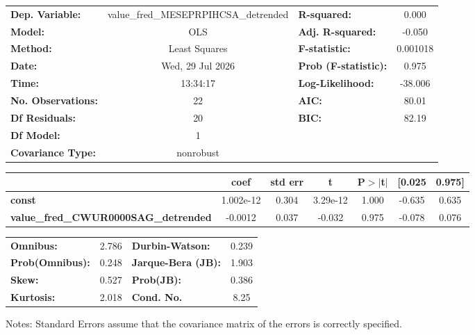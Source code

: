 \begin{center}
\begin{tabular}{lclc}
\toprule
\textbf{Dep. Variable:}                      & value\_fred\_MESEPRPIHCSA\_detrended & \textbf{  R-squared:         } &     0.000   \\
\textbf{Model:}                              &                 OLS                  & \textbf{  Adj. R-squared:    } &    -0.050   \\
\textbf{Method:}                             &            Least Squares             & \textbf{  F-statistic:       } &  0.001018   \\
\textbf{Date:}                               &           Wed, 29 Jul 2026           & \textbf{  Prob (F-statistic):} &    0.975    \\
\textbf{Time:}                               &               13:34:17               & \textbf{  Log-Likelihood:    } &   -38.006   \\
\textbf{No. Observations:}                   &                    22                & \textbf{  AIC:               } &     80.01   \\
\textbf{Df Residuals:}                       &                    20                & \textbf{  BIC:               } &     82.19   \\
\textbf{Df Model:}                           &                     1                & \textbf{                     } &             \\
\textbf{Covariance Type:}                    &              nonrobust               & \textbf{                     } &             \\
\bottomrule
\end{tabular}
\begin{tabular}{lcccccc}
                                             & \textbf{coef} & \textbf{std err} & \textbf{t} & \textbf{P$> |$t$|$} & \textbf{[0.025} & \textbf{0.975]}  \\
\midrule
\textbf{const}                               &    1.002e-12  &        0.304     &  3.29e-12  &         1.000        &       -0.635    &        0.635     \\
\textbf{value\_fred\_CWUR0000SAG\_detrended} &      -0.0012  &        0.037     &    -0.032  &         0.975        &       -0.078    &        0.076     \\
\bottomrule
\end{tabular}
\begin{tabular}{lclc}
\textbf{Omnibus:}       &  2.786 & \textbf{  Durbin-Watson:     } &    0.239  \\
\textbf{Prob(Omnibus):} &  0.248 & \textbf{  Jarque-Bera (JB):  } &    1.903  \\
\textbf{Skew:}          &  0.527 & \textbf{  Prob(JB):          } &    0.386  \\
\textbf{Kurtosis:}      &  2.018 & \textbf{  Cond. No.          } &     8.25  \\
\bottomrule
\end{tabular}
\end{center}

Notes: \newline
 [1] Standard Errors assume that the covariance matrix of the errors is correctly specified.